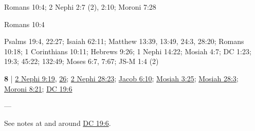 \begin{compactdesc}
		\item[end(s) of the law] Romans 10:4; 2 Nephi 2:7 (2), 2:10; Moroni 7:28
			\begin{compactdesc}
				\item[Bible anchor verses] Romans 10:4
					\begin{compactdesc}
						\item[Romans 10:4] 
					\end{compactdesc}
			\end{compactdesc}
			
		\item[end(s) of the world] Psalms 19:4, 22:27; Isaiah 62:11; Matthew 13:39, 13:49, 24:3, 28:20; Romans 10:18; 1 Corinthians 10:11; Hebrews 9:26; 1 Nephi 14:22; Mosiah 4:7; DC 1:23; 19:3; 45:22; 132:49; Moses 6:7, 7:67; JS-M 1:4 (2)
		
		\item[endless torment] \textbf{8} | \hyperref[2NEPHI-9-19]{2 Nephi 9:19}, \hyperref[2NEPHI-9-26]{26}; \hyperref[2NEPHI-28-23]{2 Nephi 28:23}; \hyperref[JACOB-6-10]{Jacob 6:10}; \hyperref[MOSIAH-3-25]{Mosiah 3:25}; \hyperref[MOSIAH-28-3]{Mosiah 28:3}; \hyperref[MORONI-8-21]{Moroni 8:21}; \hyperref[DC19-6]{DC 19:6}
			\begin{compactdesc}
				\item[Bible anchor verses] ---
				\item[Commentary] See notes at and around \hyperref[DC19-6]{DC 19:6}.
			\end{compactdesc}
		

\end{compactdesc}
